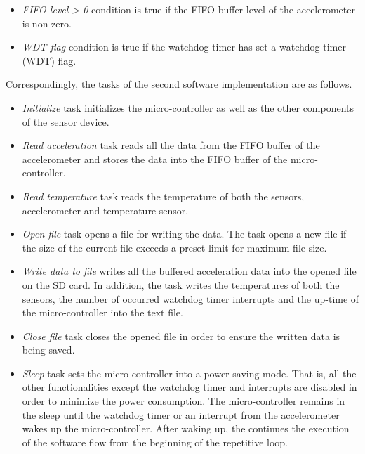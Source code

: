 \documentclass[english,12pt,a4paper,pdftex,elec,utf8]{aaltothesis}
\begin{document}
 
\begin{itemize}
\item \textit{FIFO-level > 0} condition is true if the FIFO buffer level of the accelerometer is non-zero.

\item \textit{WDT flag} condition is true if the watchdog timer has set a watchdog timer (WDT) flag.
\end{itemize}
Correspondingly, the tasks of the second software implementation are as follows.


\begin{itemize}
\item \textit{Initialize} task initializes the micro-controller as well as the other components of the sensor device.

\item \textit{Read acceleration} task reads all the data from the FIFO buffer of the accelerometer and stores the data into the FIFO buffer of the micro-controller.

\item \textit{Read temperature} task reads the temperature of both the sensors, accelerometer and temperature sensor.

\item \textit{Open file} task opens a file for writing the data. The task opens a new file if the size of the current file exceeds a preset limit for maximum file size.

\item \textit{Write data to file} writes all the buffered acceleration data into the opened file on the SD card. In addition, the task writes the temperatures of both the sensors, the number of occurred watchdog timer interrupts and the up-time of the micro-controller into the text file.

\item \textit{Close file} task closes the opened file in order to ensure the written data is being saved. 

\item \textit{Sleep} task sets the micro-controller into a power saving mode. That is, all the other functionalities except the watchdog timer and interrupts are disabled in order to minimize the power consumption. The micro-controller remains in the sleep until the watchdog timer or an interrupt from the accelerometer wakes up the micro-controller. After waking up, the continues the execution of the software flow from the beginning of the repetitive loop.

\end{itemize}
\end{document}
